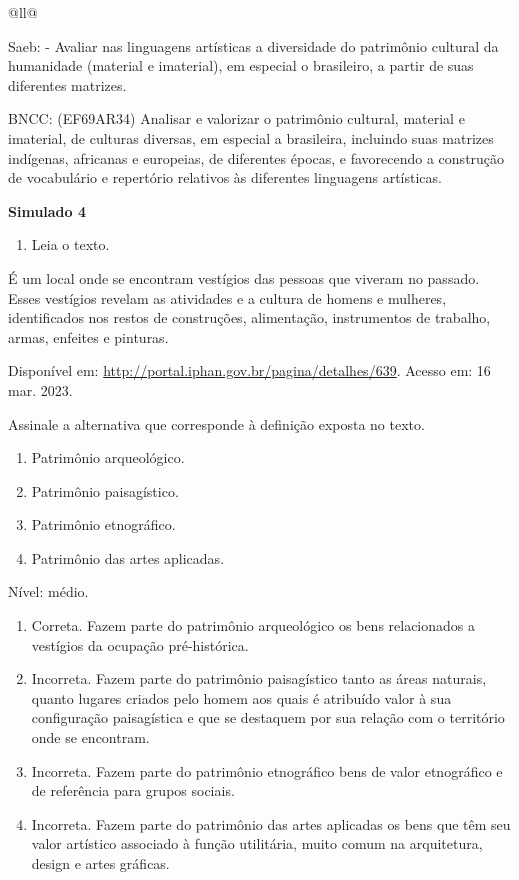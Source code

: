 \begin{itemize}
\begin{itemize}
\begin{escolha}[]{@{}ll@{}}
{{{{{{{{Saeb: - Avaliar nas linguagens artísticas a diversidade do patrimônio
cultural da humanidade (material e imaterial), em especial o brasileiro,
a partir de suas diferentes matrizes.

BNCC: (EF69AR34) Analisar e valorizar o patrimônio cultural, material e
imaterial, de culturas diversas, em especial a brasileira, incluindo
suas matrizes indígenas, africanas e europeias, de diferentes épocas, e
favorecendo a construção de vocabulário e repertório relativos às
diferentes linguagens artísticas.

\textbf{Simulado 4}

\begin{enumerate}
\def\labelenumi{\arabic{enumi}.}
\item
  Leia o texto.
\end{enumerate}

É um local onde se encontram vestígios das pessoas que viveram no
passado. Esses vestígios revelam as atividades e a cultura de homens e
mulheres, identificados nos restos de construções, alimentação,
instrumentos de trabalho, armas, enfeites e pinturas.~

Disponível em: \url{http://portal.iphan.gov.br/pagina/detalhes/639}.
Acesso em: 16 mar. 2023.

Assinale a alternativa que corresponde à definição exposta no texto.

\begin{enumerate}
\def\labelenumi{\alph{enumi}.}
\item
  Patrimônio arqueológico.
\item
  Patrimônio paisagístico.
\item
  Patrimônio etnográfico.
\item
  Patrimônio das artes aplicadas.
\end{enumerate}

Nível: médio.

\begin{enumerate}
\def\labelenumi{\alph{enumi}.}
\item
  Correta. Fazem parte do patrimônio arqueológico os bens relacionados a
  vestígios da ocupação pré-histórica.
\item
  Incorreta. Fazem parte do patrimônio paisagístico tanto as áreas
  naturais, quanto lugares criados pelo homem aos quais é atribuído
  valor à sua configuração paisagística e que se destaquem por sua
  relação com o território onde se encontram.
\item
  Incorreta. Fazem parte do patrimônio etnográfico bens de valor
  etnográfico e de referência para grupos sociais.
\item
  Incorreta. Fazem parte do patrimônio das artes aplicadas os bens que
  têm seu valor artístico associado à função utilitária, muito comum na
  arquitetura, design e artes gráficas.
\end{enumerate}

}}}}}}}}
\end{escolha}
\end{itemize}
\end{itemize}
